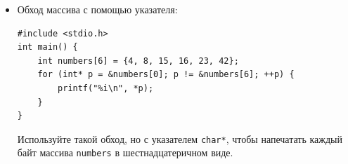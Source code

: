 \documentclass{article}
\begin{document}
\begin{itemize}
Чему равны следующие выражения:
\begin{multicols}{3}
\begin{enumerate}
\item \begin{verbatim} numbers[5] \end{verbatim}
\item \begin{verbatim} *p \end{verbatim}
\item \begin{verbatim} *(p+1) \end{verbatim}
\item \begin{verbatim} *(p-2) \end{verbatim}
\item \begin{verbatim} p[0] \end{verbatim}
\item \begin{verbatim} p[1] \end{verbatim}
\item \begin{verbatim} p[-2] \end{verbatim}
\item \begin{verbatim} *numbers \end{verbatim}
\item \begin{verbatim} *(numbers+5) \end{verbatim}
\item \begin{verbatim} p - numbers \end{verbatim}
\item \begin{verbatim} (short*)p - (short*)numbers \end{verbatim}
\item \begin{verbatim} (char*)p - (char*)numbers \end{verbatim}
\end{enumerate}
\end{multicols}
Подсказка: имя массива во многих случаях ведёт себя как указатель на первый элемент массива. \\

\item Обход массива с помощью указателя:
\begin{lstlisting}
#include <stdio.h>
int main() {
    int numbers[6] = {4, 8, 15, 16, 23, 42};
    for (int* p = &numbers[0]; p != &numbers[6]; ++p) {
        printf("%i\n", *p);
    }
}
\end{lstlisting}
Используйте такой обход, но с указателем \texttt{char*}, чтобы напечатать каждый байт массива \texttt{numbers} в шестнадцатеричном виде.
\end{itemize}
\end{document}
